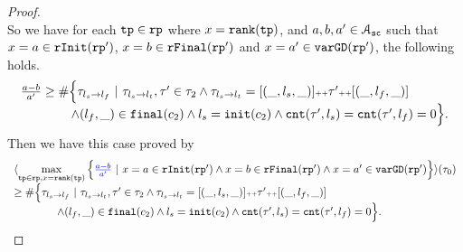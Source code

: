 \begin{proof}
\\
So we have for each $\mathtt{tp} \in \mathtt{rp}$ where $x = \mathtt{rank}(\mathtt{tp})$,
and $a, b, a ' \in \mathcal{A}_{\mathtt{sc}}$
such that $x = a \in \mathtt{rInit}(\mathtt{rp}')$, $x = b \in \mathtt{rFinal}(\mathtt{rp}')$ and $x = a' \in \mathtt{varGD}(\mathtt{rp}')$,
the following holds.
\[
  \begin{array}{l}
  \frac{a - b}{a'} \geq
    \# \Big\{\mathtt{\tau}_{l_s \to l_f} ~\vert~ \mathtt{\tau}_{l_s \to l_t}, \mathtt{\tau}' \in \mathtt{\tau}_2 \land \mathtt{\tau}_{l_s \to l_t} = [(\_, l_s, \_)] {\scriptscriptstyle ++} \mathtt{\tau}' {\scriptscriptstyle ++} [(\_, l_f, \_)]
    \\ \qquad \qquad
    \land (l_{f}, \_) \in \mathtt{final}(c_2)
    \land l_s = \mathtt{init}(c_2)
    \land \mathtt{cnt}(\mathtt{\tau}', l_s) = \mathtt{cnt}(\mathtt{\tau}', l_f) = 0 
    \Big\}.
    \end{array}
\]
Then we have this case proved by
\[
  \begin{array}{l}
    \config{
      \max\limits_{\tpath \in \rprog, x = \locbound(\tpath)}
    \Big\{ \highlight{\frac{a - b}{a'}} ~\vert~ x = a \in \rfinit(\rprog')
    \land x = b \in \rffinal(\rprog') 
    \land x = a' \in \varGD(\rprog')
    \Big\}
    }(\trace_0) \\
    \geq
    \# \Big\{\trace_{l_s \to l_f} ~\vert~ \trace_{l_s \to l_t}, \trace' \in \trace_2 \land \trace_{l_s \to l_t} = [(\_, l_s, \_)] \tracecat \trace' \tracecat [(\_, l_f, \_)]
    \\ \qquad \qquad
    \land (l_{f}, \_) \in \absfinal(c_2)
    \land l_s = \absinit(c_2)
    \land \counter(\trace', l_s) = \counter(\trace', l_f) = 0 
    \Big\}.
    \end{array}
\]
\end{proof}